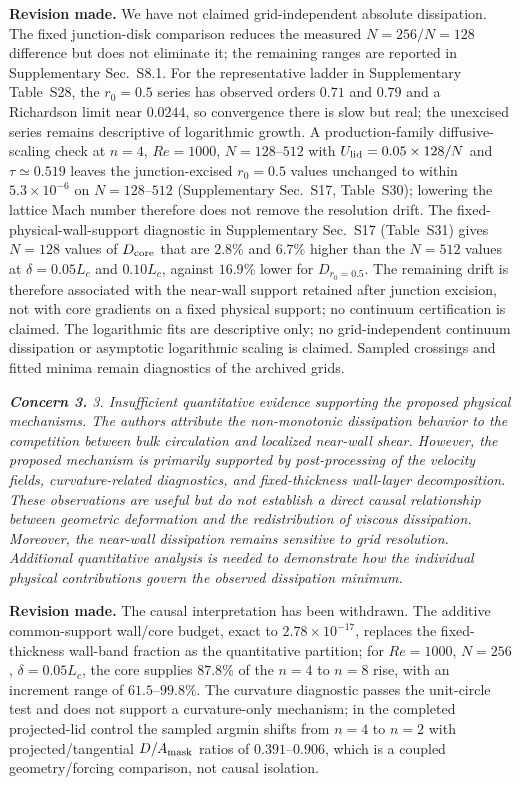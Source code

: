 \documentclass[11pt,a4paper]{article}
\newcommand{\qcomment}[1]{\textcolor{deepblue}{\itshape #1}}
\newcommand{\revwork}[1]{\textbf{\textcolor{revgreen}{#1}}}
\begin{document}
\noindent\revwork{Revision made.} We have not claimed grid-independent absolute dissipation. The fixed junction-disk comparison reduces the measured $N=256/N=128$ difference but does not eliminate it; the remaining ranges are reported in Supplementary Sec.~S8.1. For the representative ladder in Supplementary Table~S28, the $r_0=0.5$ series has observed orders $0.71$ and $0.79$ and a Richardson limit near $0.0244$, so convergence there is slow but real; the unexcised series remains descriptive of logarithmic growth. A production-family diffusive-scaling check at $n=4$, $Re=1000$, $N=128$--$512$ with $U_{\rm lid}=0.05\times128/N$ and $\tau\simeq0.519$ leaves the junction-excised $r_0=0.5$ values unchanged to within $5.3\times10^{-6}$ on $N=128$--$512$ (Supplementary Sec.~S17, Table~S30); lowering the lattice Mach number therefore does not remove the resolution drift. The fixed-physical-wall-support diagnostic in Supplementary Sec.~S17 (Table~S31) gives $N=128$ values of $D_{\rm core}$ that are $2.8\%$ and $6.7\%$ higher than the $N=512$ values at $\delta=0.05L_c$ and $0.10L_c$, against $16.9\%$ lower for $D_{r_0=0.5}$. The remaining drift is therefore associated with the near-wall support retained after junction excision, not with core gradients on a fixed physical support; no continuum certification is claimed. The logarithmic fits are descriptive only; no grid-independent continuum dissipation or asymptotic logarithmic scaling is claimed. Sampled crossings and fitted minima remain diagnostics of the archived grids.

\medskip
\noindent\qcomment{\textbf{Concern 3.} 3. Insufficient quantitative evidence supporting the proposed physical mechanisms. The authors attribute the non-monotonic dissipation behavior to the competition between bulk circulation and localized near-wall shear. However, the proposed mechanism is primarily supported by post-processing of the velocity fields, curvature-related diagnostics, and fixed-thickness wall-layer decomposition. These observations are useful but do not establish a direct causal relationship between geometric deformation and the redistribution of viscous dissipation. Moreover, the near-wall dissipation remains sensitive to grid resolution. Additional quantitative analysis is needed to demonstrate how the individual physical contributions govern the observed dissipation minimum.}

\noindent\revwork{Revision made.} The causal interpretation has been withdrawn. The additive common-support wall/core budget, exact to $2.78\times10^{-17}$, replaces the fixed-thickness wall-band fraction as the quantitative partition; for $Re=1000$, $N=256$, $\delta=0.05L_c$, the core supplies $87.8\%$ of the $n=4$ to $n=8$ rise, with an increment range of $61.5$--$99.8\%$. The curvature diagnostic passes the unit-circle test and does not support a curvature-only mechanism; in the completed projected-lid control the sampled argmin shifts from $n=4$ to $n=2$ with projected/tangential $D/A_{\rm mask}$ ratios of $0.391$--$0.906$, which is a coupled geometry/forcing comparison, not causal isolation.
\end{document}

